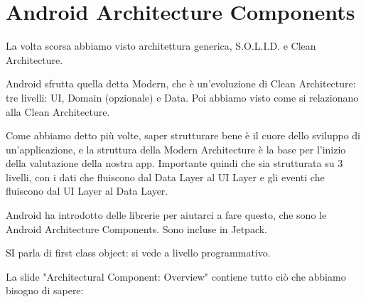 
\chapter{Android Architecture Components}
\par La volta scorsa abbiamo visto architettura generica, S.O.L.I.D. e Clean Architecture.
\par Android sfrutta quella detta Modern, che è un'evoluzione di Clean Architecture: tre livelli: UI, Domain (opzionale) e Data. Poi abbiamo visto come si relazionano alla Clean Architecture.
\par Come abbiamo detto più volte, saper strutturare bene è il cuore dello sviluppo di un'applicazione, e la struttura della Modern Architecture è la base per l'inizio della valutazione della nostra app. Importante quindi che sia strutturata su 3 livelli, con i dati che fluiscono dal Data Layer al UI Layer e gli eventi che fluiscono dal UI Layer al Data Layer.
\par Android ha introdotto delle librerie per aiutarci a fare questo, che sono le Android Architecture Components. Sono incluse in Jetpack.
\par SI parla di first class object: si vede a livello programmativo.
\par La slide "Architectural Component: Overview" contiene tutto ciò che abbiamo bisogno di sapere:
